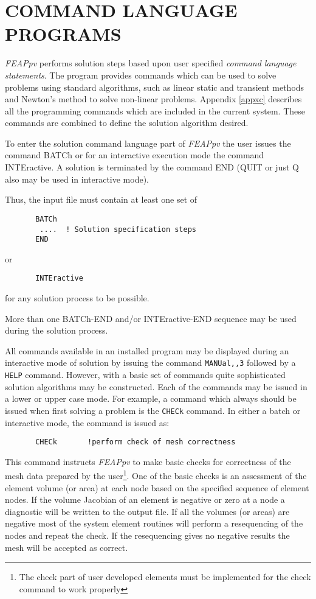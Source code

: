 \chapter[Command Language Programs]{COMMAND LANGUAGE PROGRAMS}
\label{command}

{\sl FEAPpv} performs solution steps based upon user specified {\it command
language statements}.  The program provides commands which can be used to solve
problems using standard algorithms, such as linear static and transient
methods and Newton's method to solve non-linear problems.
Appendix \ref{appxc} describes all the programming
commands which are included in the current system.  These commands are
combined to define the solution algorithm desired.

To enter the solution command language part of {\sl FEAPpv}
the user issues the command BATCh or for an
interactive execution mode the command INTEractive.  A solution
is terminated by the command END (QUIT or just Q
also may be used in interactive mode).

Thus, the input file must contain at least one set of
\begin{verbatim}
       BATCh
        ....  ! Solution specification steps
       END
\end{verbatim}
or
\begin{verbatim}
       INTEractive
\end{verbatim}
for any solution process to be possible.

More than one BATCh-END and/or
INTE\-rac\-tive-END sequence may be used during the solution process.

All commands available in an installed program may be displayed during
an interactive mode of solution by issuing
the command {\tt MANUal,,3} followed by a {\tt HELP} command.
However, with a basic
set of commands quite sophisticated solution algorithms may
be constructed.  Each of the commands may be issued in a
lower or upper case mode.  For example, a command which
always should be issued when first solving a problem
is the {\tt CHECk} command.  In either a batch or interactive mode,
the command is issued as:
\begin{verbatim}
       CHECk       !perform check of mesh correctness
\end{verbatim}
This command instructs {\sl FEAPpv} to make
basic checks for correctness of the mesh data prepared by the user{\footnote
{The check part of user developed elements must be implemented for the
check command to work properly}}.
One of the basic checks is an assessment of the element volume (or area)
at each node based on the specified sequence of
element nodes.  If the volume Jacobian of an element is negative or zero
at a node a diagnostic will be written to the output file.  If
all the volumes (or areas) are negative most of the system element routines
will perform a resequencing of the nodes and repeat the check.
If the resequencing gives no negative results the mesh will be
accepted as correct.


